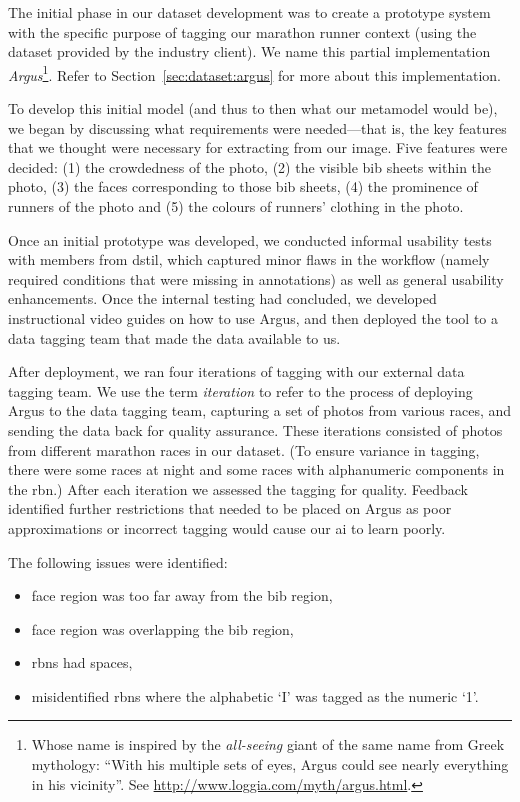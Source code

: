 The initial phase in our dataset development was to create a prototype system with the specific purpose of tagging our marathon runner context (using the dataset provided by the industry client). We name this partial implementation \textit{Argus}\footnote{Whose name is inspired by the \textit{all-seeing} giant of the same name from Greek mythology: ``With his multiple sets of eyes, Argus could see nearly everything in his vicinity''. See \url{http://www.loggia.com/myth/argus.html}.}. Refer to Section~\ref{sec:dataset:argus} for more about this implementation. 

To develop this initial model (and thus to then what our metamodel would be), we began by discussing what requirements were needed---that is, the key features that we thought were necessary for extracting from our image. Five features were decided: (1) the crowdedness of the photo, (2) the visible bib sheets within the photo, (3) the faces corresponding to those bib sheets, (4) the prominence of runners of the photo and (5) the colours of runners' clothing in the photo.

Once an initial prototype was developed, we conducted informal usability tests with members from \gls{dstil}, which captured minor flaws in the workflow (namely required conditions that were missing in annotations) as well as general usability enhancements. Once the internal testing had concluded, we developed instructional video guides on how to use Argus, and then deployed the tool to a data tagging team that made the data available to us.

After deployment, we ran four iterations of tagging with our external data tagging team. We use the term \textit{iteration} to refer to the process of deploying Argus to the data tagging team, capturing a set of photos from various races, and sending the data back for quality assurance. These iterations consisted of photos from different marathon races in our dataset. (To ensure variance in tagging, there were some races at night and some races with alphanumeric components in the \gls{rbn}.) After each iteration we assessed the tagging for quality. Feedback identified further restrictions that needed to be placed on Argus as poor approximations or incorrect tagging would cause our \gls{ai} to learn poorly. 

The following issues were identified:

\begin{itemize}
  \item face region was too far away from the bib region,
  \item face region was overlapping the bib region,
  \item \glspl{rbn} had spaces,
  \item misidentified \glspl{rbn} where the alphabetic `I' was tagged as the numeric `1'.
\end{itemize}

